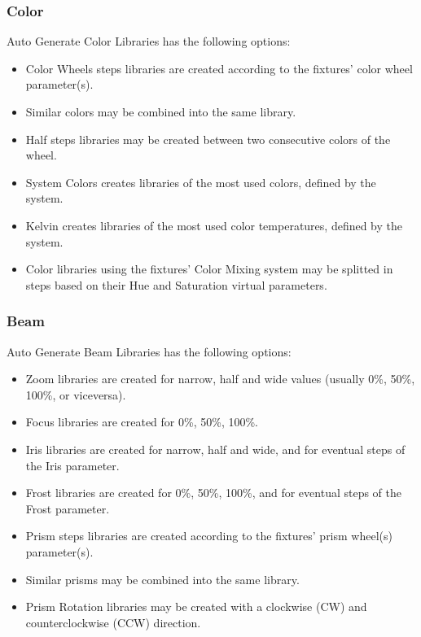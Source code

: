 \documentclass[
]{article}
\begin{document}
\hypertarget{color-1}{%
\subsubsection{Color}\label{color-1}}

Auto Generate Color Libraries has the following options:

\begin{itemize}
\item
  Color Wheels steps libraries are created according to the fixtures' color wheel parameter(s).
\item
  Similar colors may be combined into the same library.
\item
  Half steps libraries may be created between two consecutive colors of the wheel.
\item
  System Colors creates libraries of the most used colors, defined by the system.
\item
  Kelvin creates libraries of the most used color temperatures, defined by the system.
\item
  Color libraries using the fixtures' Color Mixing system may be splitted in steps based on their Hue and Saturation virtual parameters.
\end{itemize}

\hypertarget{beam-1}{%
\subsubsection{Beam}\label{beam-1}}

Auto Generate Beam Libraries has the following options:

\begin{itemize}
\item
  Zoom libraries are created for narrow, half and wide values (usually 0\%, 50\%, 100\%, or viceversa).
\item
  Focus libraries are created for 0\%, 50\%, 100\%.
\item
  Iris libraries are created for narrow, half and wide, and for eventual steps of the Iris parameter.
\item
  Frost libraries are created for 0\%, 50\%, 100\%, and for eventual steps of the Frost parameter.
\item
  Prism steps libraries are created according to the fixtures' prism wheel(s) parameter(s).
\item
  Similar prisms may be combined into the same library.
\item
  Prism Rotation libraries may be created with a clockwise (CW) and counterclockwise (CCW) direction.
\end{itemize}
\end{document}
